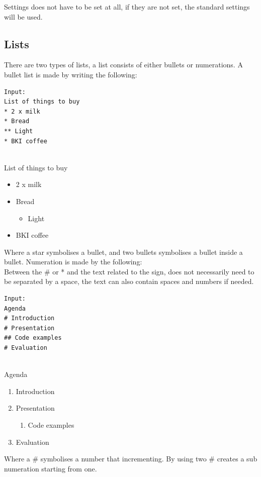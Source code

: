 Settings does not have to be set at all, if they are not set, the standard settings will be used.

\subsection*{Lists}
There are two types of lists, a list consists of either bullets or numerations.
A bullet list is made by writing the following:\\

\begin{verbatim}
Input:
List of things to buy
* 2 x milk
* Bread
** Light
* BKI coffee
\end{verbatim}
 
 \\
List of things to buy
\begin{itemize}
\item 2 x milk
\item Bread
\begin{itemize}
\item Light
\end{itemize}
\item BKI coffee
\end{itemize}

Where a star symbolises a bullet, and two bullets symbolises a bullet inside a bullet.
Numeration is made by the following: \\
Between the \# or * and the text related to the sign, does not necessarily need to be separated by a space, the text can also contain spaces and numbers if needed.\\

\begin{verbatim}
Input:
Agenda
# Introduction
# Presentation
## Code examples
# Evaluation
\end{verbatim}

 \\
Agenda
\begin{enumerate}
\item Introduction
\item Presentation
\begin{enumerate}
\item Code examples
\end{enumerate}
\item Evaluation
\end{enumerate}

Where a \# symbolises a number that incrementing. By using two \# creates a sub numeration starting from one.

